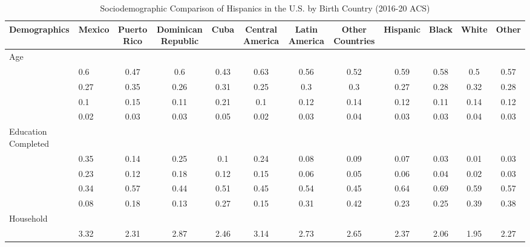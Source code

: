 \begin{table}[ht]
\centering
\caption{Sociodemographic Comparison of Hispanics in the U.S. by Birth Country (2016-20 ACS)} 
\begingroup\small
\begin{tabular}{>{\raggedright\arraybackslash}p{3.2cm}|lcccccc|cccc}
  \hline
Demographics & Mexico & Puerto Rico & Dominican Republic & Cuba & Central America & Latin America & Other Countries & Hispanic & Black & White & Other \\ 
  \hline
Age &  &  &  &  &  &  &  &  &  &  &  \\ 
  \multicolumn{1}{>{\raggedleft\arraybackslash}p{1.5cm}|}{\makebox[1.5cm][r]{60 - 69 }}& 0.6 & 0.47 & 0.6 & 0.43 & 0.63 & 0.56 & 0.52 & 0.59 & 0.58 & 0.5 & 0.57 \\ 
  \multicolumn{1}{>{\raggedleft\arraybackslash}p{1.5cm}|}{\makebox[1.5cm][r]{70 - 79 }}& 0.27 & 0.35 & 0.26 & 0.31 & 0.25 & 0.3 & 0.3 & 0.27 & 0.28 & 0.32 & 0.28 \\ 
  \multicolumn{1}{>{\raggedleft\arraybackslash}p{1.5cm}|}{\makebox[1.5cm][r]{80 - 89 }}& 0.1 & 0.15 & 0.11 & 0.21 & 0.1 & 0.12 & 0.14 & 0.12 & 0.11 & 0.14 & 0.12 \\ 
  \multicolumn{1}{>{\raggedleft\arraybackslash}p{1.5cm}|}{\makebox[1.5cm][r]{90 plus }}& 0.02 & 0.03 & 0.03 & 0.05 & 0.02 & 0.03 & 0.04 & 0.03 & 0.03 & 0.04 & 0.03 \\ 
  Education Completed &  &  &  &  &  &  &  &  &  &  &  \\ 
  \multicolumn{1}{>{\raggedleft\arraybackslash}p{3.2cm}|}{\makebox[3.2cm][r]{Less than Primary }}& 0.35 & 0.14 & 0.25 & 0.1 & 0.24 & 0.08 & 0.09 & 0.07 & 0.03 & 0.01 & 0.03 \\ 
  \multicolumn{1}{>{\raggedleft\arraybackslash}p{1.7cm}|}{\makebox[1.7cm][r]{Primary }}& 0.23 & 0.12 & 0.18 & 0.12 & 0.15 & 0.06 & 0.05 & 0.06 & 0.04 & 0.02 & 0.03 \\ 
  \multicolumn{1}{>{\raggedleft\arraybackslash}p{2cm}|}{\makebox[2cm][r]{Secondary }}& 0.34 & 0.57 & 0.44 & 0.51 & 0.45 & 0.54 & 0.45 & 0.64 & 0.69 & 0.59 & 0.57 \\ 
  \multicolumn{1}{>{\raggedleft\arraybackslash}p{2cm}|}{\makebox[2cm][r]{University }}& 0.08 & 0.18 & 0.13 & 0.27 & 0.15 & 0.31 & 0.42 & 0.23 & 0.25 & 0.39 & 0.38 \\ 
  Household &  &  &  &  &  &  &  &  &  &  &  \\ 
  \multicolumn{1}{>{\raggedleft\arraybackslash}p{2.7cm}|}{\makebox[2.7cm][r]{Household Size }}& 3.32 & 2.31 & 2.87 & 2.46 & 3.14 & 2.73 & 2.65 & 2.37 & 2.06 & 1.95 & 2.27 \\ 

\end{tabular}
\end{table}
